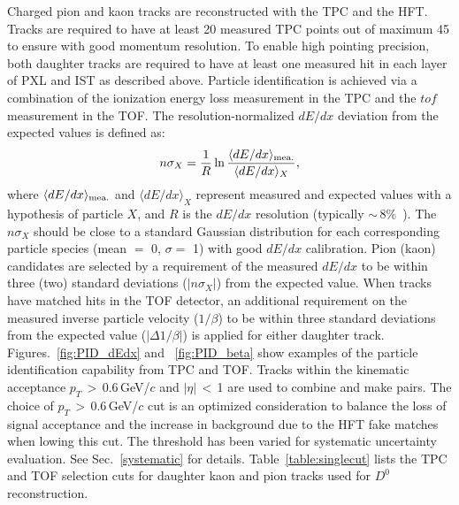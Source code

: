 \documentclass[%
 reprint,	
 amsmath,amssymb,
 aps,
 prc,
]{revtex4-1}
\begin{document}
Charged pion and kaon tracks are reconstructed with the TPC and the HFT. Tracks are required to have at least 20 measured TPC points out of maximum 45 to ensure with good momentum resolution. To enable high pointing precision, both daughter tracks are required to have at least one measured hit in each layer of PXL and IST as described above. Particle identification is achieved via a combination of the ionization energy loss measurement in the TPC and the $tof$ measurement in the TOF. The resolution-normalized $dE/dx$ deviation from the expected values is defined as:
\begin{equation}
  n\sigma_X = \frac{1}{R}\ln\frac{\langle{dE/dx}\rangle_{\rm {mea.}}}{\langle{dE/dx}\rangle_{X}},
\label{equ:equation1}
\end{equation}
where $\langle{dE/dx}\rangle_{\rm {mea.}}$ and $\langle{dE/dx}\rangle_{X}$ represent measured and expected values with a hypothesis of particle $X$, and $R$ is the $dE/dx$ resolution (typically $\sim$\,8\%~\cite{TPC}). The $n\sigma_X$ should be close to a standard Gaussian distribution for each corresponding particle species (mean $=$ 0, $\sigma = $ 1) with good $dE/dx$ calibration.
Pion (kaon) candidates are selected by a requirement of the measured $dE/dx$ to be within three (two) standard deviations ($|n\sigma_{X}|$) from the expected value. When tracks have matched hits in the TOF detector, an additional requirement on the measured inverse particle velocity ($1/\beta$) to be within three standard deviations from the expected value ($|\Delta 1/\beta|$) is applied for either daughter track. Figures.~\ref{fig:PID_dEdx} and ~\ref{fig:PID_beta} show examples of the particle identification capability from TPC and TOF. Tracks within the kinematic acceptance $p_{T}$\,$>$\,0.6\,GeV/$c$ and $|\eta|$\,$<$\,1 are used to combine and make pairs. The choice of $p_T$\,$>$\,0.6\,GeV/$c$ cut is an optimized consideration to balance the loss of signal acceptance and the increase in background due to the HFT fake matches when lowing this cut. The threshold has been varied for systematic uncertainty evaluation. See Sec.~\ref{systematic} for details. Table~\ref{table:singlecut} lists the TPC and TOF selection cuts for daughter kaon and pion tracks used for $D^0$ reconstruction.

\begin{table}
\label{table:singlecut} 
\end{table}
\end{document}
